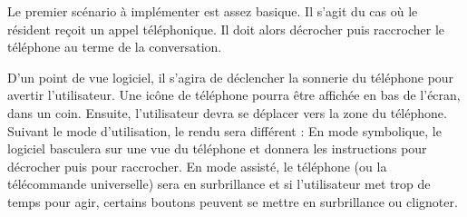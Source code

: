 Le premier scénario à implémenter est assez basique. Il s'agit du cas où le résident reçoit un appel téléphonique. Il doit alors décrocher puis raccrocher le téléphone au terme de la conversation.

D'un point de vue logiciel, il s'agira de déclencher la sonnerie du téléphone pour avertir l'utilisateur. Une icône de téléphone pourra être affichée en bas de l'écran, dans un coin. Ensuite, l'utilisateur devra se déplacer vers la zone du téléphone. Suivant le mode d'utilisation, le rendu sera différent : En mode symbolique, le logiciel basculera sur une vue du téléphone et donnera les instructions pour décrocher puis pour raccrocher. En mode assisté, le téléphone (ou la télécommande universelle) sera en surbrillance et si l'utilisateur met trop de temps pour agir, certains boutons peuvent se mettre en surbrillance ou clignoter.

